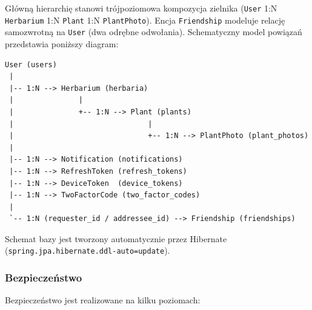 \documentclass[12pt,a4paper]{article}
\begin{document}
G\l{}\'own\k{a} hierarchi\k{e} stanowi tr\'ojpoziomowa kompozycja zielnika (\texttt{User} 1:N \texttt{Herbarium} 1:N \texttt{Plant} 1:N \texttt{PlantPhoto}). Encja \texttt{Friendship} modeluje relacj\k{e} samozwrotn\k{a} na \texttt{User} (dwa odr\k{e}bne odwo\l{}ania). Schematyczny model powi\k{a}za\'n przedstawia poni\.zszy diagram:

\begin{lstlisting}[style=ascii, caption=Powiazania miedzy encjami (uproszczony diagram ER)]
User (users)
 |
 |-- 1:N --> Herbarium (herbaria)
 |               |
 |               +-- 1:N --> Plant (plants)
 |                               |
 |                               +-- 1:N --> PlantPhoto (plant_photos)
 |
 |-- 1:N --> Notification (notifications)
 |-- 1:N --> RefreshToken (refresh_tokens)
 |-- 1:N --> DeviceToken  (device_tokens)
 |-- 1:N --> TwoFactorCode (two_factor_codes)
 |
 `-- 1:N (requester_id / addressee_id) --> Friendship (friendships)
\end{lstlisting}

Schemat bazy jest tworzony automatycznie przez Hibernate (\texttt{spring.\allowbreak{}jpa.\allowbreak{}hibernate.\allowbreak{}ddl-\allowbreak{}auto=\allowbreak{}update}).

\subsubsection{Bezpiecze\'nstwo}

Bezpiecze\'nstwo jest realizowane na kilku poziomach:
\end{document}
